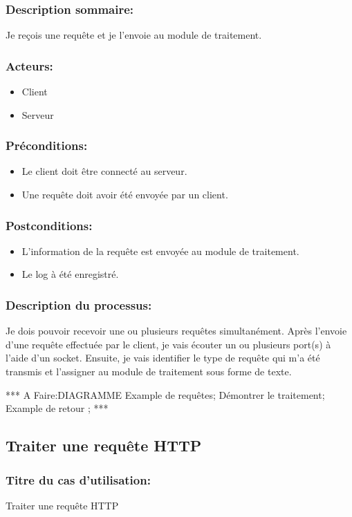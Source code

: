 \documentclass{scrreprt}
\begin{document}
\begin{itemizen}
\subsubsection{Description sommaire:} Je reçois une requête et je l'envoie au module de traitement.
\subsubsection{Acteurs:}
\begin{itemize}
    \item Client
    \item Serveur
\end{itemize}
\subsubsection{Préconditions:}
\begin{itemize}
	\item Le client doit être connecté au serveur.
    \item Une requête doit avoir été envoyée par un client.
\end{itemize} 
\subsubsection{Postconditions:}
\begin{itemize}
    \item  L'information de la requête est envoyée au module de traitement.
    \item  Le log à été enregistré.
\end{itemize} 
\subsubsection{Description du processus:}
Je dois pouvoir recevoir une ou plusieurs requêtes simultanément. Après l'envoie d'une requête effectuée par le client, je vais écouter un ou plusieurs port(s) à l'aide d'un socket. Ensuite, je vais identifier le type de requête qui m'a été transmis et l'assigner au module de traitement sous forme de texte.


*** A Faire:DIAGRAMME
Example de requêtes;
Démontrer le traitement;
Example de retour ;
***

\subsection{Traiter une requête HTTP}
\subsubsection{Titre du cas d'utilisation:} Traiter une requête HTTP

\end{itemizen}
\end{document}
